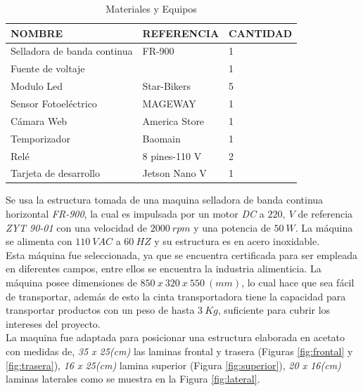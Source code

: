 \begin{table}[ht]
	\centering
	\resizebox{10cm}{!} {
	\begin{tabular}{|p{5cm}|p{3.5cm}|p{2.5cm}|}
		\hline
		NOMBRE & REFERENCIA & CANTIDAD \\ 
		\hline
		Selladora de banda continua & FR-900 & 1 \\
		\hline
		Fuente de voltaje &  & 1 \\
		\hline
		Modulo Led & Star-Bikers & 5 \\
		\hline
		Sensor Fotoeléctrico & MAGEWAY & 1 \\
		\hline
		Cámara Web & America Store & 1 \\
		\hline
		Temporizador & Baomain  & 1 \\
		\hline
		Relé & 8 pines-110 V & 2 \\
		\hline
		Tarjeta de desarrollo & Jetson Nano V & 1 \\
		\hline
	\end{tabular}	
	}
	\caption{Materiales y Equipos}
	\label{table:materiales}
\end{table}	

Se usa la estructura tomada de una maquina selladora de banda continua horizontal \textit{FR-900}, la cual es impulsada por un motor \textit{DC} a $220, \ V$ de referencia \textit{ZYT 90-01} con una velocidad de $2000 \ rpm$ y una potencia de $50 \ W$. La máquina se alimenta con $110 \ VAC$ a $60 \ HZ$ y su estructura es en acero inoxidable.\\

Esta máquina fue seleccionada, ya que se encuentra certificada para ser empleada en diferentes campos, entre ellos se encuentra la industria alimenticia. La máquina posee dimensiones de $850 \ x \ 320 \ x \ 550 \ (mm) $, lo cual hace que sea fácil de transportar, además de esto la cinta transportadora tiene la capacidad para transportar productos con un peso de hasta $3 \ Kg$, suficiente para cubrir los intereses del proyecto.\\

La maquina fue adaptada para posicionar una estructura elaborada en acetato con medidas de, \textit{35 x 25(cm)} las laminas frontal y trasera (Figuras \ref{fig:frontal} y \ref{fig:trasera}), \textit{16 x 25(cm)} lamina superior (Figura \ref{fig:superior}), \textit{20 x 16(cm)} laminas laterales como se muestra en la Figura \ref{fig:lateral}.\\


